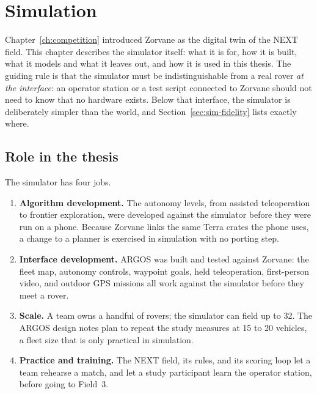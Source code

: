 
\chapter{Simulation}
\label{ch:simulation}

Chapter~\ref{ch:competition} introduced Zorvane as the digital twin of the NEXT field.
This chapter describes the simulator itself: what it is for, how it is built, what it models and what it leaves out, and how it is used in this thesis.
The guiding rule is that the simulator must be indistinguishable from a real rover \emph{at the interface}: an operator station or a test script connected to Zorvane should not need to know that no hardware exists.
Below that interface, the simulator is deliberately simpler than the world, and Section~\ref{sec:sim-fidelity} lists exactly where.

\section{Role in the thesis}
\label{sec:sim-role}

The simulator has four jobs.

\begin{enumerate}
\item \textbf{Algorithm development.}
  The autonomy levels, from assisted teleoperation to frontier exploration, were developed against the simulator before they were run on a phone.
  Because Zorvane links the same Terra crates the phone uses, a change to a planner is exercised in simulation with no porting step.
\item \textbf{Interface development.}
  ARGOS was built and tested against Zorvane: the fleet map, autonomy controls, waypoint goals, held teleoperation, first-person video, and outdoor GPS missions all work against the simulator before they meet a rover.
\item \textbf{Scale.}
  A team owns a handful of rovers; the simulator can field up to 32.
  The ARGOS design notes plan to repeat the study measures at 15 to 20 vehicles, a fleet size that is only practical in simulation.
\item \textbf{Practice and training.}
  The NEXT field, its rules, and its scoring loop let a team rehearse a match, and let a study participant learn the operator station, before going to Field~3.
\end{enumerate}

